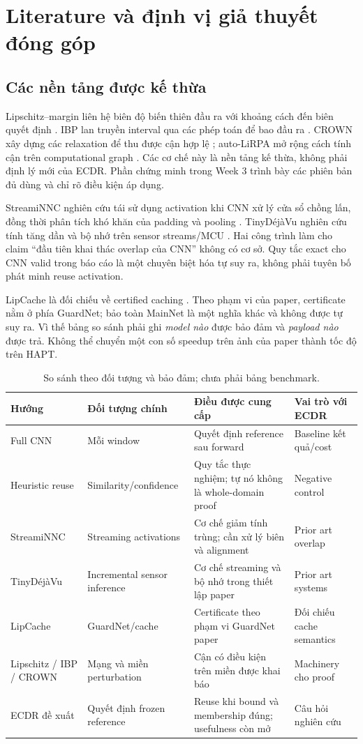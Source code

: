 \documentclass[11pt,a4paper]{article}
\theoremstyle{remark}
\begin{document}
\section{Literature và định vị giả thuyết đóng góp}
\subsection{Các nền tảng được kế thừa}
Lipschitz--margin liên hệ biên độ biến thiên đầu ra với khoảng cách đến
biên quyết định \cite{lmt}. IBP lan truyền interval qua các phép toán để
bao đầu ra \cite{ibp}. CROWN xây dựng các relaxation để thu được cận hợp lệ
\cite{crown}; auto-LiRPA mở rộng cách tính cận trên computational graph
\cite{lirpa}. Các cơ chế này là nền tảng kế thừa, không phải định lý mới của
ECDR. Phần chứng minh trong Week 3 trình bày các phiên bản đủ dùng và chỉ rõ
điều kiện áp dụng.

StreamiNNC nghiên cứu tái sử dụng activation khi CNN xử lý cửa sổ chồng
lấn, đồng thời phân tích khó khăn của padding và pooling \cite{streaminnc}.
TinyD\'ej\`aVu nghiên cứu tính tăng dần và bộ nhớ trên sensor streams/MCU
\cite{tiny}. Hai công trình làm cho claim ``đầu tiên khai thác overlap của
CNN'' không có cơ sở. Quy tắc exact cho CNN valid trong báo cáo là một
chuyên biệt hóa tự suy ra, không phải tuyên bố phát minh reuse activation.

LipCache là đối chiếu về certified caching \cite{lipcache}. Theo phạm vi
của paper, certificate nằm ở phía GuardNet; bảo toàn MainNet là một nghĩa
khác và không được tự suy ra. Vì thế bảng so sánh phải ghi \emph{model nào}
được bảo đảm và \emph{payload nào} được trả. Không thể chuyển một con số
speedup trên ảnh của paper thành tốc độ trên HAPT.

\begin{table}[!htbp]\centering\small
\caption{So sánh theo đối tượng và bảo đảm; chưa phải bảng benchmark.}
\begin{tabularx}{\linewidth}{@{}p{2.25cm}YYY@{}}\toprule
Hướng & Đối tượng chính & Điều được cung cấp & Vai trò với ECDR\\\midrule
Full CNN & Mỗi window & Quyết định reference sau forward & Baseline kết quả/cost\\
Heuristic reuse & Similarity/confidence & Quy tắc thực nghiệm; tự nó không là
whole-domain proof & Negative control\\
StreamiNNC & Streaming activations & Cơ chế giảm tính trùng; cần xử lý biên
và alignment & Prior art overlap\\
TinyD\'ej\`aVu & Incremental sensor inference & Cơ chế streaming và bộ nhớ
trong thiết lập paper & Prior art systems\\
LipCache & GuardNet/cache & Certificate theo phạm vi GuardNet paper & Đối
chiếu cache semantics\\
Lipschitz / IBP / CROWN & Mạng và miền perturbation & Cận có điều kiện trên miền
được khai báo & Machinery cho proof\\
ECDR đề xuất & Quyết định frozen reference & Reuse khi bound và membership
đúng; usefulness còn mở & Câu hỏi nghiên cứu\\\bottomrule
\end{tabularx}
\end{table}
\end{document}
